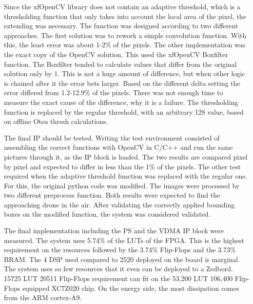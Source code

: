 Since the xfOpenCV library does not contain an adaptive threshold, which is a thresholding function that only takes into account the local area of the pixel, the extending was necessary.
The function was designed according to two different approaches.
The first solution was to rework a simple convolution function.
With this, the least error was about 1-2\% of the pixels.
The other implementation was the exact copy of the OpenCV solution.
This used the xfOpenCV Boxfilter function.
The Boxfilter tended to calculate values that differ from the original solution only by 1.
This is not a huge amount of difference, but when other logic is chained after it the error bets larger.
Based on the different delta setting the error differed from 1.2-12.9\% of the pixels.
There was not enough time to measure the exact cause of the difference, why it is a failure.
The thresholding function is replaced by the regular threshold, with an arbitrary 128 value, based on offline Otsu thresh calculations.

The final IP should be tested.
Writing the test environment consisted of assembling the correct functions with OpenCV in C/C++ and run the same pictures through it, as the IP block is loaded.
The two results are compared pixel by pixel and expected to differ in less than the 1\% of the pixels.
The other test required when the adaptive threshold function was replaced with the regular one.
For this, the original python code was modified.
The images were processed by two different preprocess function.
Both results were expected to find the approaching drone in the air.
After validating the correctly applied bounding boxes on the modified function, the system was considered validated.

The final implementation including the PS and the VDMA IP block were measured.
The system uses 5.74\% of the LUTs of the FPGA.
This is the highest requirement on the resources followed by the 3.74\% Flip-Flops and the 3.73\% BRAM.
The 4 DSP used compared to 2520 deployed on the board is marginal.
The system uses so few resources that it even can be deployed to a Zedbord.
15725 LUT 20511 Flip-Flops requirement can fit on the 53,200 LUT 106,400 Flip-Flops equipped XC7Z020 chip.
On the energy side, the most dissipation comes from the ARM cortex-A9.


\clearpage
